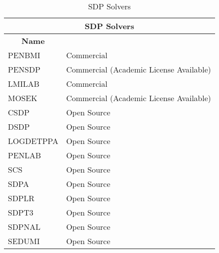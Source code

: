 \begin{longtable}{|l|l|}
    \caption{SDP Solvers}
    \label{tab:SDP Solvers}\\
\hline
    \multicolumn{2}{|c|}{\textbf{SDP Solvers}}                              
    \\ \hline
\endfirsthead
%
\endhead
%
\multicolumn{1}{|c|}{\textbf{Name}} &                                         \\ \hline
PENBMI                              & Commercial                              \\ \hline
PENSDP                              & Commercial (Academic License Available) \\ \hline
LMILAB                              & Commercial                              \\ \hline
MOSEK                               & Commercial (Academic License Available) \\ \hline
CSDP                                & Open Source                             \\ \hline
DSDP                                & Open Source                             \\ \hline
LOGDETPPA                           & Open Source                             \\ \hline
PENLAB                              & Open Source                             \\ \hline
SCS                                 & Open Source                             \\ \hline
SDPA                                & Open Source                             \\ \hline
SDPLR                               & Open Source                             \\ \hline
SDPT3                               & Open Source                             \\ \hline
SDPNAL                              & Open Source                             \\ \hline
SEDUMI                              & Open Source                             \\ \hline
\end{longtable}


